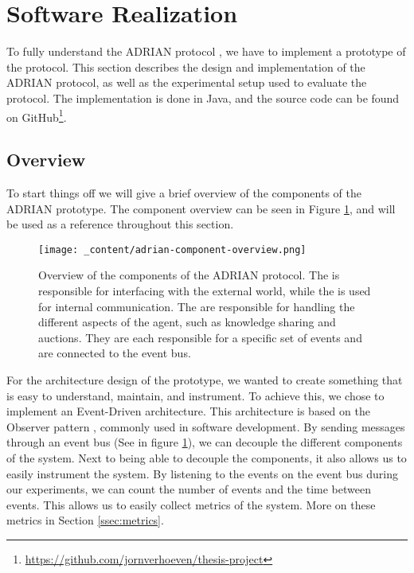 \section{Software Realization}
\label{sec:software-realization}
To fully understand the ADRIAN protocol \cite{mann2023ADRIAN}, we have to implement a prototype of the protocol. This section describes the design and implementation of the ADRIAN protocol, as well as the experimental setup used to evaluate the protocol. The implementation is done in Java, and the source code can be found on GitHub\footnote{\url{https://github.com/jornverhoeven/thesis-project}}. 


\subsection{Overview}
\label{ssec:overview}
To start things off we will give a brief overview of the components of the ADRIAN prototype. The component overview can be seen in Figure \ref{fig:adrian-component-overview}, and will be used as a reference throughout this section.

\begin{figure}[H]
    \centering
    \texttt{[image: \_content/adrian-component-overview.png]}
    \caption{Overview of the components of the ADRIAN protocol. The  is responsible for interfacing with the external world, while the  is used for internal communication. The  are responsible for handling the different aspects of the agent, such as knowledge sharing and auctions. They are each responsible for a specific set of events and are connected to the event bus.}
    \label{fig:adrian-component-overview}
\end{figure}

For the architecture design of the prototype, we wanted to create something that is easy to understand, maintain, and instrument. To achieve this, we chose to implement an Event-Driven architecture. This architecture is based on the Observer pattern \cite{gamma1995design}, commonly used in software development. By sending messages through an event bus (See  in figure \ref{fig:adrian-component-overview}), we can decouple the different components of the system. Next to being able to decouple the components, it also allows us to easily instrument the system. By listening to the events on the event bus during our experiments, we can count the number of events and the time between events. This allows us to easily collect metrics of the system. More on these metrics in Section \ref{ssec:metrics}.

